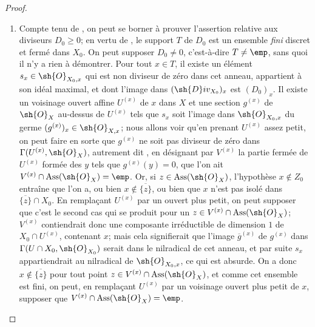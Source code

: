\begin{proof}
\begin{enumerate}[label=(\roman*)]
  \item Compte tenu de , on peut se borner à prouver l'assertion relative aux diviseurs $D_0\geq0$;
en vertu de , le support $T$ de $D_0$ est un ensemble \emph{fini} discret et fermé dans $X_0$.
On peut supposer $D_0\neq0$, c'est-à-dire $T\neq\emp$, sans quoi il n'y a rien à démontrer.
Pour tout $x\in T$, il existe un élément $s_x\in\sh{O}_{X_0,x}$ qui est non diviseur de zéro dans cet anneau, appartient à son idéal maximal, et dont l'image dans $(\sh{D}iv_{X_0})_x$ est $(D_0)_x$.
Il existe un voisinage ouvert affine $U^{(x)}$ de $x$ dans $X$ et une section $g^{(x)}$ de $\sh{O}_X$ au-dessus de $U^{(x)}$ tels que $s_x$ soit l'image dans $\sh{O}_{X_0,x}$ du germe $(g^{(x)})_x\in\sh{O}_{X,x}$;
nous allons voir qu'en prenant $U^{(x)}$ assez petit, on peut faire en sorte que $g^{(x)}$ ne soit pas diviseur de zéro dans $\Gamma(U^{(x)},\sh{O}_X)$, autrement dit , en désignant par $V^{(x)}$ la partie fermée de $U^{(x)}$ formée des $y$ tels que $g^{(x)}(y)=0$, que l'on ait $V^{(x)}\cap\operatorname{Ass}(\sh{O}_X)=\emp$.
Or, si $z\in\operatorname{Ass}(\sh{O}_X)$, l'hypothèse $x\notin Z_0$ entraîne que l'on a, ou bien $x\notin\overline{\{z\}}$, ou bien que $x$ n'est pas isolé dans $\overline{\{z\}}\cap X_0$.
En remplaçant $U^{(x)}$ par un ouvert plus petit, on peut supposer que c'est le second cas qui se produit pour un $z\in V^{(x)}\cap\operatorname{Ass}(\sh{O}_X)$;
$V^{(x)}$ contiendrait donc une composante irréductible de dimension $1$ de $X_0\cap U^{(x)}$, contenant $x$;
mais cela signifierait que l'image $\overline{g}^{(x)}$ de $g^{(x)}$ dans $\Gamma(U\cap X_0,\sh{O}_{X_0})$ serait dans le nilradical de cet anneau, et par suite $s_x$ appartiendrait au nilradical de $\sh{O}_{X_0,x}$, ce qui est absurde.
On a donc $x\notin\overline{\{z\}}$ pour tout point $z\in V^{(x)}\cap\operatorname{Ass}(\sh{O}_X)$, et comme cet ensemble est fini, on peut, en remplaçant $U^{(x)}$ par un voisinage ouvert plus petit de $x$, supposer que $V^{(x)}\cap\operatorname{Ass}(\sh{O}_X)=\emp$.


\end{enumerate}
\end{proof}

